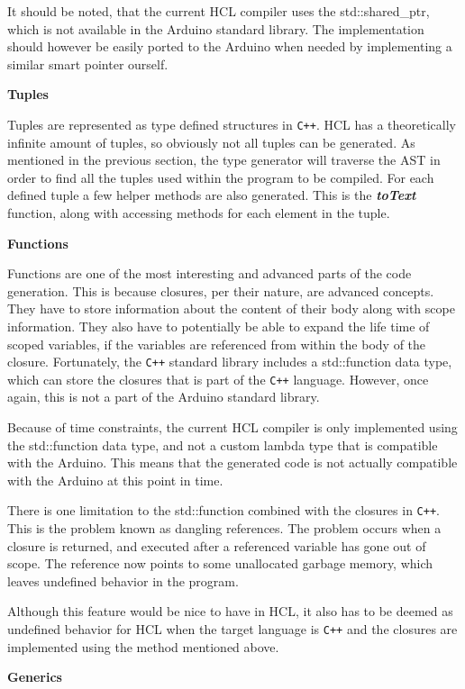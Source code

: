 It should be noted, that the current HCL compiler uses the std::shared\_ptr, which is not available in the Arduino standard library.
The implementation should however be easily ported to the Arduino when needed by implementing a similar smart pointer ourself.

\textbf{Tuples}

Tuples are represented as type defined structures in \texttt{C++}.
HCL has a theoretically infinite amount of tuples, so obviously not all tuples can be generated.
As mentioned in the previous section, the type generator will traverse the AST in order to find all the tuples used within the program to be compiled.
For each defined tuple a few helper methods are also generated.
This is the \textit{\textbf{toText}} function, along with accessing methods for each element in the tuple.

\textbf{Functions}

Functions are one of the most interesting and advanced parts of the code generation.
This is because closures, per their nature, are advanced concepts.
They have to store information about the content of their body along with scope information.
They also have to potentially be able to expand the life time of scoped variables, if the variables are referenced from within the body of the closure.
Fortunately, the \texttt{C++} standard library includes a std::function data type, which can store the closures that is part of the \texttt{C++} language.
However, once again, this is not a part of the Arduino standard library.

Because of time constraints, the current HCL compiler is only implemented using the std::function data type, and not a custom lambda type that is compatible with the Arduino.
This means that the generated code is not actually compatible with the Arduino at this point in time.

There is one limitation to the std::function combined with the closures in \texttt{C++}.
This is the problem known as dangling references.
The problem occurs when a closure is returned, and executed after a referenced variable has gone out of scope.
The reference now points to some unallocated garbage memory, which leaves undefined behavior in the program.

Although this feature would be nice to have in HCL, it also has to be deemed as undefined behavior for HCL when the target language is \texttt{C++} and the closures are implemented using the method mentioned above.

\textbf{Generics}

